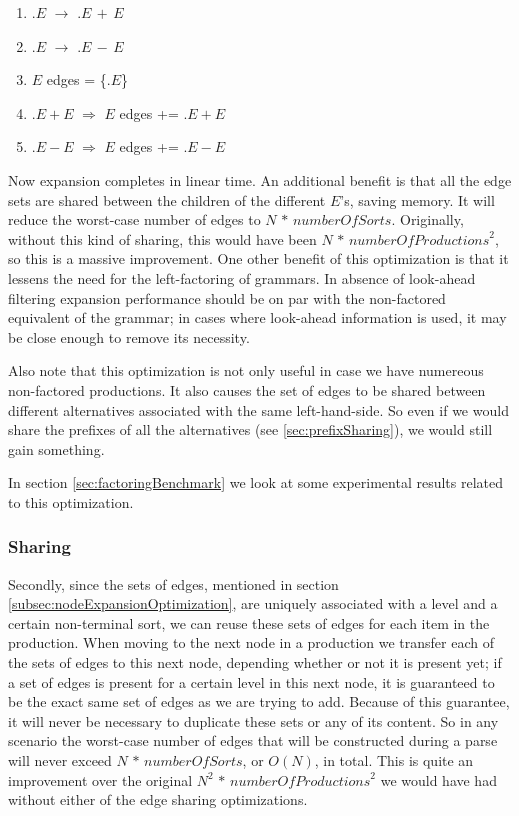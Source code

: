 \documentclass[a4paper,10pt]{article}
\begin{document}
\begin{enumerate}
 \setlength{\itemsep}{0pt}
 \setlength{\parskip}{0pt}
 \setlength{\parsep}{0pt}
 
 \item $.E$ $\rightarrow$ $.E\,+\,E$
 \item $.E$ $\rightarrow$ $.E\,-\,E$
 \item $E$ edges = \{$.E$\}
 \item $.E+E$ $\Rightarrow$ $E$ edges += $.E+E$
 \item $.E-E$ $\Rightarrow$ $E$ edges += $.E-E$
\end{enumerate}
Now expansion completes in linear time. An additional benefit is that all the edge sets are shared between the children of the different $E$'s, saving memory. It will reduce the worst-case number of edges to $N\,*\,\mathit{numberOfSorts}$. Originally, without this kind of sharing, this would have been $N\,*\,\mathit{numberOfProductions}^2$, so this is a massive improvement. One other benefit of this optimization is that it lessens the need for the left-factoring of grammars. In absence of look-ahead filtering expansion performance should be on par with the non-factored equivalent of the grammar; in cases where look-ahead information is used, it may be close enough to remove its necessity.

Also note that this optimization is not only useful in case we have numereous non-factored productions. It also causes the set of edges to be shared between different alternatives associated with the same left-hand-side. So even if we would share the prefixes of all the alternatives (see \ref{sec:prefixSharing}), we would still gain something.

In section \ref{sec:factoringBenchmark} we look at some experimental results related to this optimization.

\subsubsection{Sharing}
Secondly, since the sets of edges, mentioned in section \ref{subsec:nodeExpansionOptimization}, are uniquely associated with a level and a certain non-terminal sort, we can reuse these sets of edges for each item in the production. When moving to the next node in a production we transfer each of the sets of edges to this next node, depending whether or not it is present yet; if a set of edges is present for a certain level in this next node, it is guaranteed to be the exact same set of edges as we are trying to add. Because of this guarantee, it will never be necessary to duplicate these sets or any of its content. So in any scenario the worst-case number of edges that will be constructed during a parse will never exceed $N\,*\,\mathit{numberOfSorts}$, or $O(N)$, in total. This is quite an improvement over the original ${N}^2\,*\,\mathit{numberOfProductions}^2$ we would have had without either of the edge sharing optimizations.
\end{document}

